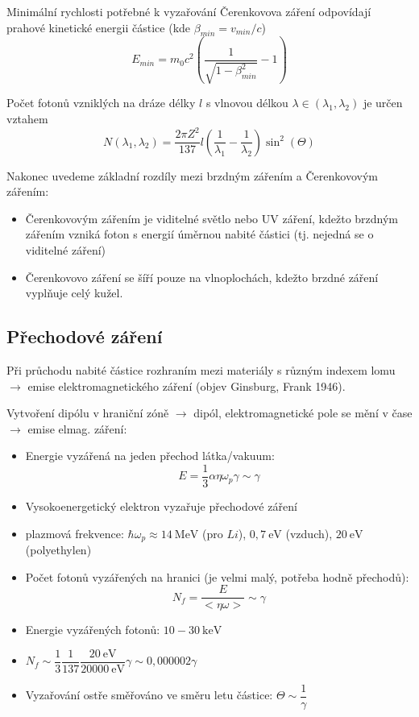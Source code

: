 \documentclass[../../main.tex]{subfiles}
\begin{document}
Minimální rychlosti potřebné k vyzařování Čerenkovova záření odpovídají prahové kinetické energii částice (kde $\beta_{min} = v_{min}/c$)
\begin{equation}
E_{min} = m_0 c^2 \left( \dfrac{1}{\sqrt{1 - \beta_{min}^2}} - 1\right) 
\end{equation}

Počet fotonů vzniklých na dráze délky $l$ s vlnovou délkou $\lambda \in (\lambda _1, \lambda_2) $ je určen vztahem
\begin{equation}
N(\lambda_1, \lambda_2) = \dfrac{2 \pi Z^2}{137} l \left( \dfrac{1}{\lambda_1} - \dfrac{1}{\lambda_2}\right) \sin^2 (\varTheta)
\end{equation}

Nakonec uvedeme základní rozdíly mezi brzdným zářením a Čerenkovovým zářením:
\begin{itemize}
	\item Čerenkovovým zářením je viditelné světlo nebo UV záření, kdežto brzdným zářením vzniká foton s energií úměrnou nabité částici (tj. nejedná se o viditelné záření)
	\item Čerenkovovo záření se šíří pouze na vlnoplochách, kdežto brzdné záření vyplňuje celý kužel.
\end{itemize}

\subsection{Přechodové záření}

Při průchodu nabité částice rozhraním mezi materiály s různým indexem lomu $\rightarrow$ emise elektromagnetického záření (objev Ginsburg, Frank 1946).

Vytvoření dipólu v hraniční zóně $\rightarrow$ dipól, elektromagnetické pole se mění v čase $\rightarrow$ emise elmag. záření:
\begin{itemize}
	\item Energie vyzářená na jeden přechod látka/vakuum:
	\begin{equation}
	E = \dfrac{1}{3} \alpha \eta \omega_p \gamma \sim \gamma
	\end{equation}
	\item Vysokoenergetický elektron vyzařuje přechodové záření 
	\item plazmová frekvence: $\hbar \omega_p \approx 14 ~\mathrm{MeV}$ (pro $Li$), $0,7 ~\mathrm{eV}$ (vzduch), $20 ~\mathrm{eV}$ (polyethylen)
	\item Počet fotonů vyzářených na hranici (je velmi malý, potřeba hodně přechodů):
	\begin{equation}
	N_f = \dfrac{E}{<\eta \omega >} \sim \gamma 
	\end{equation}
	\item Energie vyzářených fotonů: $10 - 30 ~\mathrm{keV}$ 
	\item $N_f \sim \dfrac{1}{3} \dfrac{1}{137} \dfrac{20 ~\mathrm{eV}}{20000 ~\mathrm{eV}} \gamma \sim 0,000002 \gamma$
	\item Vyzařování ostře směřováno ve směru letu částice: $\varTheta \sim \dfrac{1}{\gamma}$
\end{itemize}
\end{document}
